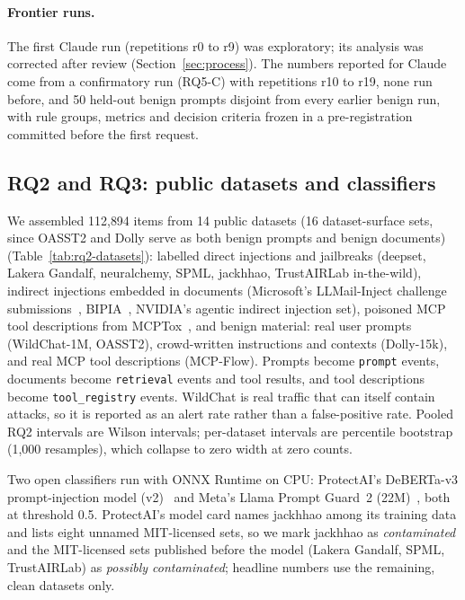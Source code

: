 \paragraph{Frontier runs.} The first Claude run (repetitions r0 to r9) was exploratory; its analysis
was corrected after review (Section~\ref{sec:process}). The numbers reported for Claude come from a
confirmatory run (RQ5-C) with repetitions r10 to r19, none run before, and 50 held-out benign prompts
disjoint from every earlier benign run, with rule groups, metrics and decision criteria frozen in a
pre-registration committed before the first request.

\subsection{RQ2 and RQ3: public datasets and classifiers}
We assembled 112{,}894 items from 14 public datasets (16 dataset-surface sets, since OASST2 and Dolly
serve as both benign prompts and benign documents) (Table~\ref{tab:rq2-datasets}): labelled direct
injections and jailbreaks (deepset, Lakera Gandalf, neuralchemy, SPML, jackhhao, TrustAIRLab
in-the-wild), indirect injections embedded in documents (Microsoft's LLMail-Inject challenge
submissions~\cite{llmail}, BIPIA~\cite{bipia}, NVIDIA's agentic indirect injection set), poisoned MCP
tool descriptions from MCPTox~\cite{mcptox}, and benign material: real user prompts (WildChat-1M,
OASST2), crowd-written instructions and contexts (Dolly-15k), and real MCP tool descriptions
(MCP-Flow). Prompts become \texttt{prompt} events, documents become \texttt{retrieval} events and
tool results, and tool descriptions become \texttt{tool\_registry} events. WildChat is real traffic
that can itself contain attacks, so it is reported as an alert rate rather than a false-positive rate.
Pooled RQ2 intervals are Wilson intervals; per-dataset intervals are percentile bootstrap (1{,}000
resamples), which collapse to zero width at zero counts.

Two open classifiers run with ONNX Runtime on CPU: ProtectAI's DeBERTa-v3 prompt-injection model
(v2)~\cite{protectai} and Meta's Llama Prompt Guard~2 (22M)~\cite{promptguard}, both at threshold 0.5.
ProtectAI's model card names jackhhao among its training data and lists eight unnamed MIT-licensed
sets, so we mark jackhhao as \emph{contaminated} and the MIT-licensed sets published before the model
(Lakera Gandalf, SPML, TrustAIRLab) as \emph{possibly contaminated}; headline numbers use the
remaining, clean datasets only.

